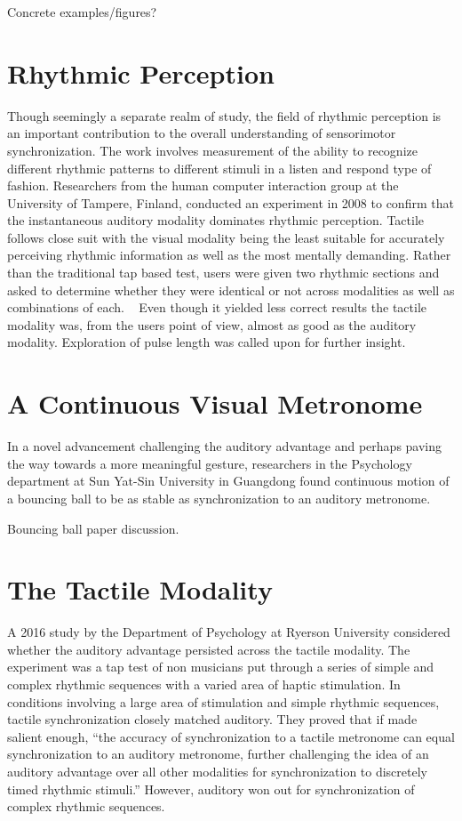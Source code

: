 Concrete examples/figures?

\section{Rhythmic Perception}
Though seemingly a separate realm of study, the field of rhythmic perception is an important contribution to the overall understanding of sensorimotor synchronization. The work involves measurement of the ability to recognize different rhythmic patterns to different stimuli in a listen and respond type of fashion. Researchers from the human computer interaction group at the University of Tampere, Finland, conducted an experiment in 2008 to confirm that the instantaneous auditory modality dominates rhythmic perception. Tactile follows close suit with the visual modality being the least suitable for accurately perceiving rhythmic information as well as the most mentally demanding. Rather than the traditional tap based test, users were given two rhythmic sections and asked to determine whether they were identical or not across modalities as well as combinations of each. ~\cite{jokiniemi2008crossmodal} Even though it yielded less correct results the tactile modality was, from the users point of view, almost as good as the auditory modality. Exploration of pulse length was called upon for further insight.

\section{A Continuous Visual Metronome} \label{visualMet}
In a novel advancement challenging the auditory advantage and perhaps paving the way towards a more meaningful gesture, researchers in the Psychology department at Sun Yat-Sin University in Guangdong found continuous motion of a bouncing ball to be as stable as synchronization to an auditory metronome.
~\cite{gan2015synchronization}


Bouncing ball paper discussion.

\section{The Tactile Modality} \label{tactileModality}
A 2016 study by the Department of Psychology at Ryerson University considered whether the auditory advantage persisted across the tactile modality. The experiment was a tap test of non musicians put through a series of simple and complex rhythmic sequences with a varied area of haptic stimulation. In conditions involving a large area of stimulation and simple rhythmic sequences, tactile synchronization closely matched auditory. They proved that if made salient enough, “the accuracy of synchronization to a tactile metronome can equal synchronization to an auditory metronome, further challenging the idea of an auditory advantage over all other modalities for synchronization to discretely timed rhythmic stimuli.” However, auditory won out for synchronization of complex rhythmic sequences. ~\cite{ammirante2016synchronizing}

